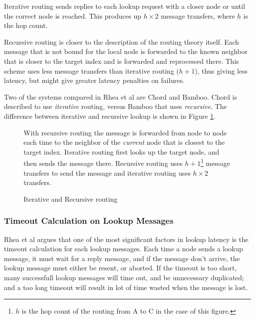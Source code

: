 Iterative routing sends replies to each lookup request with a closer node or until the
 correct node is reached. This produces up $h\times 2$ message transfers,
 where $h$ is the hop count.

Recursive routing is closer to the description of the routing theory itself. Each
 message that is not bound for the local node is forwarded to the known neighbor that is
 closer to the target index and is forwarded and reprocessed there.
 This scheme uses less message transfers than iterative routing ($h+1$), thus
 giving less latency, but might give greater latency penalties on failures.

Two of the systems compared in Rhea et al\cite{rhea-04-handling-churn} are Chord and Bamboo. Chord
 is described to use \emph{iterative} routing, versus Bamboo that uses \emph{recursive}.
 The difference between iterative and recursive lookup is shown in Figure
 \ref{fig:Recursive+Iterative-Routing}.

\begin{figure}[htp] %
\begin{center}
\parbox{.9\linewidth}{\small
With recursive routing the message is forwarded from node to node each time to the
 neighbor of the \emph{current} node that is closest to the target index. Iterative
 routing first looks up the target node, and then sends the message there. Recursive
 routing uses $h+1$\footnote{$h$ is the hop count of the routing from A to C in the
 case of this figure.} message transfers to send the message and iterative routing
 uses $h\times 2$ transfers.
}
\caption{Iterative and Recursive routing}\label{fig:Recursive+Iterative-Routing}
\end{center}
\end{figure}


\subsubsection{Timeout Calculation on Lookup Messages}
\label{theory:Routing:Timeout}

Rhea et al\cite{rhea-04-handling-churn} argues that one of the most significant factors
 in lookup latency is the timeout calculation for each lookup messages. Each time a node
 sends a lookup message, it must wait for a reply message, and if the message don't
 arrive, the lookup message must either be resent, or aborted. If the timeout is too short,
 many successfull lookup messages will time out, and be unnecessary duplicated; and a too
 long timeout will result in lot of time wasted when the message is lost.

